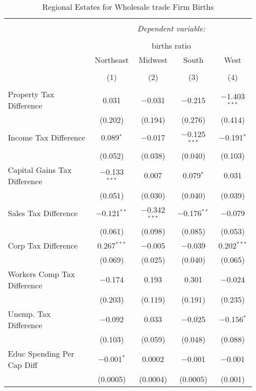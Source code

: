 
\begin{table}[!htbp] \centering 
  \caption{Regional Estates for  Wholesale trade Firm Births} 
  \label{} 
\begin{tabular}{@{\extracolsep{5pt}}lcccc} 
\\[-1.8ex]\hline 
\hline \\[-1.8ex] 
 & \multicolumn{4}{c}{\textit{Dependent variable:}} \\ 
\cline{2-5} 
\\[-1.8ex] & \multicolumn{4}{c}{births ratio} \\ 
 & Northeast & Midwest & South & West \\ 
\\[-1.8ex] & (1) & (2) & (3) & (4)\\ 
\hline \\[-1.8ex] 
 Property Tax Difference & 0.031 & $-$0.031 & $-$0.215 & $-$1.403$^{***}$ \\ 
  & (0.202) & (0.194) & (0.276) & (0.414) \\ 
  Income Tax Difference & 0.089$^{*}$ & $-$0.017 & $-$0.125$^{***}$ & $-$0.191$^{*}$ \\ 
  & (0.052) & (0.038) & (0.040) & (0.103) \\ 
  Capital Gains Tax Difference & $-$0.133$^{***}$ & 0.007 & 0.079$^{*}$ & 0.031 \\ 
  & (0.051) & (0.030) & (0.040) & (0.039) \\ 
  Sales Tax Difference & $-$0.121$^{**}$ & $-$0.342$^{***}$ & $-$0.176$^{**}$ & $-$0.079 \\ 
  & (0.061) & (0.098) & (0.085) & (0.053) \\ 
  Corp Tax Difference & 0.267$^{***}$ & $-$0.005 & $-$0.039 & 0.202$^{***}$ \\ 
  & (0.069) & (0.025) & (0.040) & (0.065) \\ 
  Workers Comp Tax Difference & $-$0.174 & 0.193 & 0.301 & $-$0.024 \\ 
  & (0.203) & (0.119) & (0.191) & (0.235) \\ 
  Unemp. Tax Difference & $-$0.092 & 0.033 & $-$0.025 & $-$0.156$^{*}$ \\ 
  & (0.103) & (0.059) & (0.048) & (0.088) \\ 
  Educ Spending Per Cap Diff & $-$0.001$^{*}$ & 0.0002 & $-$0.001 & $-$0.001 \\ 
  & (0.0005) & (0.0004) & (0.0005) & (0.001) \\ 

\end{tabular}
\end{table}
